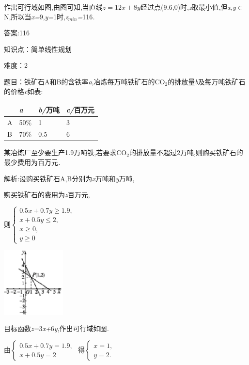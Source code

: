\documentclass{article} %
\begin{document}
作出可行域如图,由图可知,当直线$z=12x+8y$经过点(9\textit{.}6,0)时,\textit{z}取最小值,但\textit{x},\textit{y}$\mathrm{\in}$N,所以当\textit{x=}9,\textit{y=}1时,\textit{z}${}_{min}$\textit{=}116\textit{.}

 答案:116

 
知识点：简单线性规划

难度：2

题目：铁矿石A和B的含铁率\textit{a},冶炼每万吨铁矿石的CO${}_{2}$的排放量\textit{b}及每万吨铁矿石的价格\textit{c}如表:

\begin{tabular}{|p{0.2in}|p{0.5in}|p{0.9in}|p{1.2in}|} \hline 
	& \textit{a} & \textit{b/}万吨 & \textit{c/}百万元 \\ \hline 
	A & 50\% & 1 & 3 \\ \hline 
	B & 70\% & 0\textit{.}5 & 6 \\ \hline 
\end{tabular}



 某冶炼厂至少要生产1\textit{.}9万吨铁,若要求CO${}_{2}$的排放量不超过2万吨,则购买铁矿石的最少费用为\textit{\underbar{　　　　　}}百万元\textit{.~}

 解析:设购买铁矿石A,B分别为\textit{x}万吨和\textit{y}万吨,

购买铁矿石的费用为\textit{z}百万元,

则$
\begin{cases}
0.5x+0.7y \ge 1.9,\\
x+0.5y \le 2,\\
x \ge 0,\\
y \ge 0
\end{cases}$

 \includegraphics*[width=1.27in, height=1.39in, keepaspectratio=false]{image1755}

目标函数\textit{z=}3\textit{x+}6\textit{y},作出可行域如图\textit{.}

由$
\begin{cases}
0.5x+0.7y=1.9,\\
x+0.5y=2
\end{cases}$
得$
\begin{cases}
x=1,\\
y=2.
\end{cases}$
\end{document}
